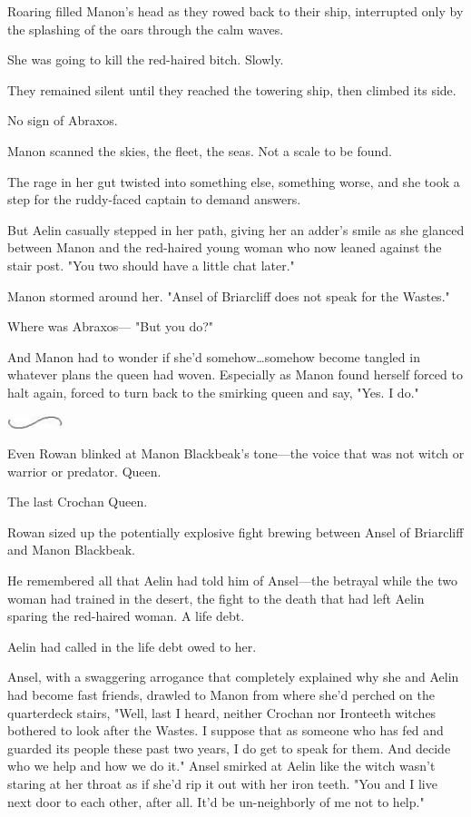Roaring filled Manon's head as they rowed back to their ship, interrupted only by the splashing of the oars through the calm waves.

She was going to kill the red-haired bitch.
Slowly.

They remained silent until they reached the towering ship, then climbed its side.

No sign of Abraxos.

Manon scanned the skies, the fleet, the seas.
Not a scale to be found.

The rage in her gut twisted into something else, something worse, and she took a step for the ruddy-faced captain to demand answers.

But Aelin casually stepped in her path, giving her an adder's smile as she glanced between Manon and the red-haired young woman who now leaned against the stair post.
"You two should have a little chat later."

Manon stormed around her.
"Ansel of Briarcliff does not speak for the Wastes."

Where was Abraxos--- "But you do?"

And Manon had to wonder if she'd somehow\ldots somehow become tangled in whatever plans the queen had woven.
Especially as Manon found herself forced to halt again, forced to turn back to the smirking queen and say, "Yes.
I do."

\begin{center}
	\includegraphics[width=0.65in,height=0.13in]{images/seperator}
\end{center}

Even Rowan blinked at Manon Blackbeak's tone---the voice that was not witch or warrior or predator.
Queen.

The last Crochan Queen.

Rowan sized up the potentially explosive fight brewing between Ansel of Briarcliff and Manon Blackbeak.

He remembered all that Aelin had told him of Ansel---the betrayal while the two woman had trained in the desert, the fight to the death that had left Aelin sparing the red-haired woman.
A life debt.

Aelin had called in the life debt owed to her.

Ansel, with a swaggering arrogance that completely explained why she and Aelin had become fast friends, drawled to Manon from where she'd perched on the quarterdeck stairs, "Well, last I heard, neither Crochan nor Ironteeth witches bothered to look after the Wastes.
I suppose that as someone who has fed and guarded its people these past two years, I do get to speak for them.
And decide who we help and how we do it."
Ansel smirked at Aelin like the witch wasn't staring at her throat as if she'd rip it out with her iron teeth.
"You and I live next door to each other, after all.
It'd be un-neighborly of me not to help."

